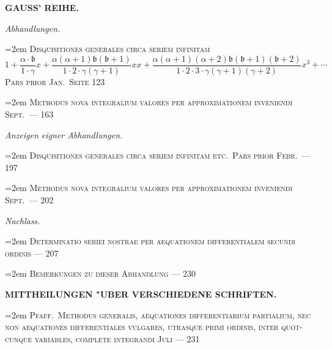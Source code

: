 \documentclass[12pt,a4paper]{article}
\begin{document}
\begin{center}
\textbf{GAUSS' REIHE.}
\end{center}

\vspace{0.5em}

\noindent\textit{Abhandlungen.}

\vspace{0.3em}
\noindent\hangindent=2em
\textsc{Disquisitiones generales circa seriem infinitam}
\[
1 + \frac{\alpha \cdot \mathfrak{b}}{1 \cdot \gamma}x + \frac{\alpha(\alpha+1)\mathfrak{b}(\mathfrak{b}+1)}{1 \cdot 2 \cdot \gamma(\gamma+1)}xx + \frac{\alpha(\alpha+1)(\alpha+2)\mathfrak{b}(\mathfrak{b}+1)(\mathfrak{b}+2)}{1 \cdot 2 \cdot 3 \cdot \gamma(\gamma+1)(\gamma+2)}x^3 + \cdots
\]
\textsc{Pars prior  Jan.\ \dotfill Seite 123}

\vspace{0.3em}
\noindent\hangindent=2em
\textsc{Methodus nova integralium valores per approximationem inveniendi  Sept.\ \dotfill --- 163}

\vspace{0.5em}
\noindent\textit{Anzeigen eigner Abhandlungen.}

\vspace{0.3em}
\noindent\hangindent=2em
\textsc{Disquisitiones generales circa seriem infinitam etc.\ Pars prior  Febr.\ \dotfill --- 197}

\vspace{0.3em}
\noindent\hangindent=2em
\textsc{Methodus nova integralium valores per approximationem inveniendi  Sept.\ \dotfill --- 202}

\vspace{0.5em}
\noindent\textit{Nachlass.}

\vspace{0.3em}
\noindent\hangindent=2em
\textsc{Determinatio seriei nostrae per aequationem differentialem secundi ordinis \dotfill --- 207}

\vspace{0.3em}
\noindent\hangindent=2em
\textsc{Bemerkungen zu dieser Abhandlung \dotfill --- 230}

\vspace{1em}
\begin{center}
\textbf{MITTHEILUNGEN "UBER VERSCHIEDENE SCHRIFTEN.}
\end{center}

\vspace{0.3em}
\noindent\hangindent=2em
\textsc{Pfaff.\ Methodus generalis, aequationes differentiarium partialium, nec non\linebreak
\hspace*{\fill} aequationes differentiales vulgares, utrasque primi ordinis, inter quot-\linebreak
\hspace*{\fill} cunque variables, complete integrandi  Juli \dotfill --- 231}
\end{document}
